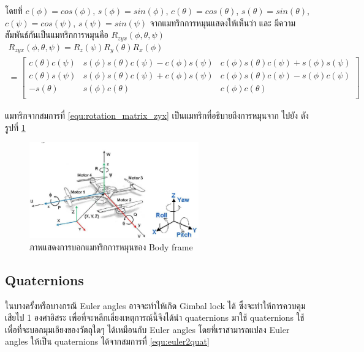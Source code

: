 โดยที่ $c(\phi) = cos(\phi)$, $s(\phi) = sin(\phi)$, $c(\theta) = cos(\theta)$, $s(\theta) = sin(\theta)$, $c(\psi) = cos(\psi)$, $s(\psi) = sin(\psi)$
จากแมทริกการหมุนแสดงให้เห็นว่า  และ 
มีความสัมพันธ์กันเป็นแมทริกการหมุนคือ $R_{zyx}(\phi,\theta,\psi)$
\begin{equation}
	\begin{array}{c}
		{R_{zyx}(\phi,\theta,\psi) = R_{z}(\psi)R_{y}(\theta)R_{x}(\phi)}\\
		{= \begin{bmatrix}
		c(\theta)c(\psi) & s(\phi)s(\theta)c(\psi)-c(\phi)s(\psi) & c(\phi)s(\theta)c(\psi)+s(\phi)s(\psi) \\
		c(\theta)s(\psi) & s(\phi)s(\theta)c(\psi)+c(\phi)s(\psi) & c(\phi)s(\theta)c(\psi)-s(\phi)c(\psi) \\
		-s(\theta)       & s(\phi)c(\theta)                       & c(\phi)c(\theta)                       \\
		\end{bmatrix}}
		\label{equ:rotation_matrix_zyx}
	\end{array}
\end{equation}

แมทริกจากสมการที่ \ref{equ:rotation_matrix_zyx} เป็นแมทริกที่อธิบายถึงการหมุนจาก  ไปยัง 
ดังรูปที่ \ref{fig:quadroter_eulerangles}
\begin{figure}[htbp]
	\centering
	\includegraphics[width=0.65\textwidth]{images/Quadcopter_EulerAngles.png}
	\caption{ภาพแสดงการบอกแมทริกการหมุนของ Body frame}
	\label{fig:quadroter_eulerangles}
\end{figure}

\clearpage
\subsection*{Quaternions}
ในบางครั้งหรือบางกรณี Euler angles อาจจะทำให้เกิด Gimbal lock ได้
ซึ่งจะทำให้การควบคุมเสียไป 1 องศาอิสระ เพื่อที่จะหลีกเลี่ยงเหตุการณ์นี้จึงได้นำ quaternions มาใช้
quaternions ใช้เพื่อที่จะบอกมุมเอียงของวัตถุใดๆ ได้เหมือนกับ Euler angles
โดยที่เราสามารถแปลง Euler angles ให้เป็น quaternions ได้จากสมการที่ \ref{equ:euler2quat}

